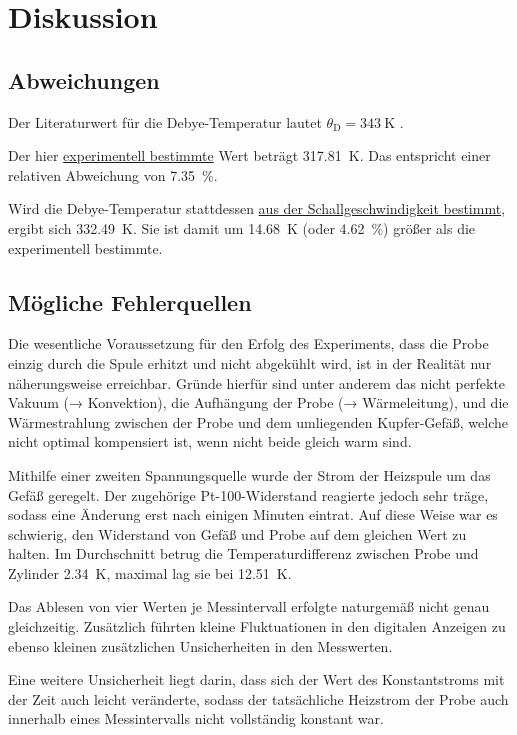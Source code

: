 \section{Diskussion}
\label{sec:diskussion}

\subsection{Abweichungen}

    Der Literaturwert für die Debye-Temperatur lautet $\theta_\text{D} = \SI{343}{\kelvin}$ \cite[Abbildung 6.9]{grossmarx}.

    Der hier \hyperref[sec:auswertung:debye_exp]{experimentell bestimmte} Wert beträgt \SI{317.81}{\kelvin}.
    Das entspricht einer relativen Abweichung von \SI{7.35}{\percent}.

    Wird die Debye-Temperatur stattdessen \hyperref[sec:auswertung:debye_vs]{aus der Schallgeschwindigkeit bestimmt},
    ergibt sich \SI{332.49}{\kelvin}.
    Sie ist damit um \SI{14.68}{\kelvin} (oder \SI{4.62}{\percent}) größer als die experimentell bestimmte.


\subsection{Mögliche Fehlerquellen}


    Die wesentliche Voraussetzung für den Erfolg des Experiments,
    dass die Probe einzig durch die Spule erhitzt und nicht abgekühlt wird,
    ist in der Realität nur näherungsweise erreichbar.
    Gründe hierfür sind unter anderem
    das nicht perfekte Vakuum (→ Konvektion),
    die Aufhängung der Probe (→ Wärmeleitung), %
    und die Wärmestrahlung zwischen der Probe und dem umliegenden Kupfer-Gefäß,
    welche nicht optimal kompensiert ist,
    wenn nicht beide gleich warm sind.

    Mithilfe einer zweiten Spannungsquelle wurde der Strom der Heizspule um das Gefäß geregelt.
    Der zugehörige Pt-100-Widerstand reagierte jedoch sehr träge,
    sodass eine Änderung erst nach einigen Minuten eintrat.
    Auf diese Weise war es schwierig,
    den Widerstand von Gefäß und Probe auf dem gleichen Wert zu halten.
    Im Durchschnitt betrug die Temperaturdifferenz zwischen Probe und Zylinder \SI{2.34}{\kelvin},
    maximal lag sie bei \SI{12.51}{\kelvin}.

    Das Ablesen von vier Werten je Messintervall erfolgte naturgemäß nicht genau gleichzeitig.
    Zusätzlich führten kleine Fluktuationen in den digitalen Anzeigen
    zu ebenso kleinen zusätzlichen Unsicherheiten in den Messwerten.

    Eine weitere Unsicherheit liegt darin,
    dass sich der Wert des Konstantstroms mit der Zeit auch leicht veränderte,
    sodass der tatsächliche Heizstrom der Probe
    auch innerhalb eines Messintervalls nicht vollständig konstant war.
